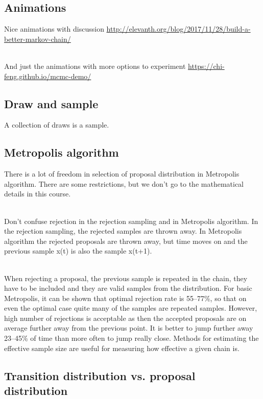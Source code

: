 \documentclass[a4paper,11pt,english]{article}
\begin{document}
\subsection*{Animations}

Nice animations with discussion
\url{http://elevanth.org/blog/2017/11/28/build-a-better-markov-chain/}

~\\
And just the animations with more options to experiment
\url{https://chi-feng.github.io/mcmc-demo/}

\subsection*{Draw and sample}

A collection of draws is a sample.

\subsection*{Metropolis algorithm}

There is a lot of freedom in selection of proposal distribution in
Metropolis algorithm. There are some restrictions, but we don't go to
the mathematical details in this course.

~\\
Don't confuse rejection in the rejection sampling and in Metropolis
algorithm. In the rejection sampling, the rejected samples are thrown
away. In Metropolis algorithm the rejected proposals are thrown away,
but time moves on and the previous sample x(t) is also the sample
x(t+1).

~\\
When rejecting a proposal, the previous sample is repeated in the
chain, they have to be included and they are valid samples from the
distribution. For basic Metropolis, it can be shown that optimal
rejection rate is 55--77\%, so that on even the optimal case quite many
of the samples are repeated samples. However, high number of
rejections is acceptable as then the accepted proposals are on average
further away from the previous point. It is better to jump further
away 23--45\% of time than more often to jump really close. Methods for
estimating the effective sample size are useful for measuring how
effective a given chain is.

\subsection*{Transition distribution vs. proposal distribution}
\end{document}
